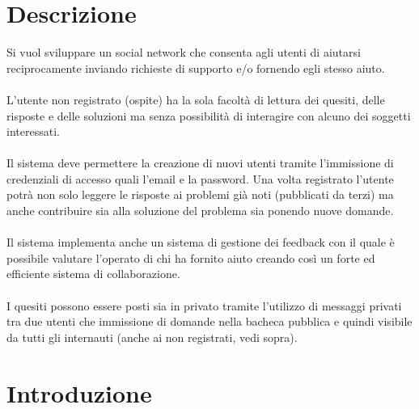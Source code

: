 \documentclass[a4paper,12pt]{article}
\begin{document}
	    \vspace*{\fill}
	\tableofcontents
	    \vspace*{\fill}

\clearpage

\section{Descrizione}
Si vuol sviluppare un social network che consenta agli utenti di aiutarsi reciprocamente inviando richieste di supporto e/o fornendo egli stesso aiuto. \\ \\
L’utente non registrato (ospite) ha la sola facoltà di lettura dei quesiti, delle risposte e delle soluzioni ma senza possibilità di interagire con alcuno dei soggetti interessati. \\ \\
Il sistema deve permettere la creazione di nuovi utenti tramite l’immissione di credenziali di accesso quali l’email e la password. Una volta registrato l’utente potrà non solo leggere le risposte ai problemi già noti (pubblicati da terzi) ma anche contribuire sia alla soluzione del problema sia ponendo nuove domande. \\ \\
Il sistema implementa anche un sistema di gestione dei feedback con il quale è possibile valutare l’operato di chi ha fornito aiuto creando così un forte ed efficiente sistema di collaborazione. \\ \\
I quesiti possono essere posti sia in privato tramite l’utilizzo di messaggi privati tra due utenti che immissione di domande nella bacheca pubblica e quindi visibile da tutti gli internauti (anche ai non registrati, vedi sopra).

\clearpage

\section{Introduzione}
\end{document}
